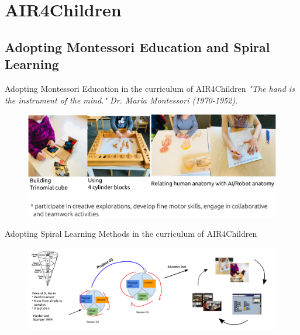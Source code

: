 \section{AIR4Children}

\subsection{Adopting Montessori Education and Spiral Learning}

{
\begin{frame}{Adopting Montessori Education in the curriculum of AIR4Children } 
  \vspace{3mm}
  \it{"The hand is the instrument of the mind."} Dr. Maria Montessori (1970-1952).
  \vspace{2mm}
    \begin{figure}
        \centering
        \includegraphics[width=1.0\textwidth]{./figures/montessori/versions/drawing-v00.png}
      \end{figure}
\end{frame}
}

{
\begin{frame}{Adopting Spiral Learning Methods in the curriculum of AIR4Children}

  \begin{figure}
        \centering
        \includegraphics[width=1.0\textwidth]{./figures/teaching-materials/versions/drawing-v02.png}
      \end{figure}
\end{frame}
}
